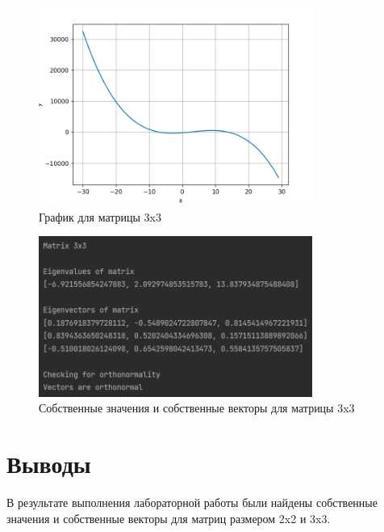 \documentclass[a4paper, 14pt]{extarticle}
\begin{document}
\begin{figure}[!htb]
	\centering
	\includegraphics[width=0.8\textwidth]{img3}
\caption{График для матрицы 3x3}
\label{fig:img3}
\end{figure}

\begin{figure}[!htb]
	\centering
	\includegraphics[width=0.8\textwidth]{img4}
\caption{Собственные значения и собственные векторы для матрицы 3x3}
\label{fig:img4}
\end{figure}

\section{Выводы}\label{Sect::conclusion}

В результате выполнения лабораторной работы были найдены собственные значения и собственные векторы для матриц размером 2x2 и 3x3.
\end{document}
